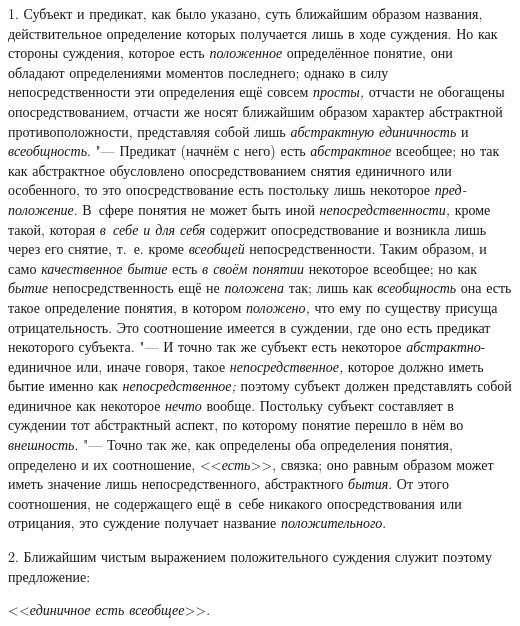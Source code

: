 1. Субъект и предикат, как было указано, суть ближайшим образом названия,
действительное определение которых получается лишь в ходе суждения. Но как
стороны суждения, которое есть {\em положенное} определённое понятие, они
обладают определениями моментов последнего; однако в силу непосредственности
эти определения ещё совсем {\em просты,} отчасти не обогащены
опосредствованием, отчасти же носят ближайшим образом характер абстрактной
противоположности, представляя собой лишь {\em абстрактную единичность} и
{\em всеобщность}. "--- Предикат (начнём с него) есть {\em абстрактное}
всеобщее; но так как абстрактное обусловлено опосредствованием снятия
единичного или особенного, то это опосредствование есть постольку лишь
некоторое {\em пред-положение}. В~сфере понятия не может быть иной
{\em непосредственности,} кроме такой, которая {\em в~себе и для себя} содержит
опосредствование и возникла лишь через его снятие, т.~е. кроме {\em всеобщей}
непосредственности. Таким образом, и само {\em качественное бытие} есть {\em в
своём понятии} некоторое всеобщее; но как {\em бытие} непосредственность ещё не
{\em положена} так; лишь как {\em всеобщность} она есть такое определение
понятия, в котором {\em положено,} что ему по существу присуща отрицательность.
Это соотношение имеется в суждении, где оно есть предикат некоторого субъекта.
"--- И точно так же субъект есть некоторое {\em абстрактно}-единичное или,
иначе говоря, такое {\em непосредственное,} которое должно иметь бытие именно
как {\em непосредственное;} поэтому субъект должен представлять собой единичное
как некоторое {\em нечто} вообще. Постольку субъект составляет в суждении тот
абстрактный аспект, по которому понятие перешло в нём во {\em внешность}. "---
Точно так же, как определены оба определения понятия, определено и их
соотношение, <<{\em есть}>>, связка; оно равным образом может иметь значение
лишь непосредственного, абстрактного {\em бытия}. От этого соотношения, не
содержащего ещё в~себе никакого опосредствования или отрицания, это суждение
получает название {\em положительного}.

2. Ближайшим чистым выражением положительного суждения служит
поэтому предложение:

<<{\em единичное есть всеобщее}>>.

